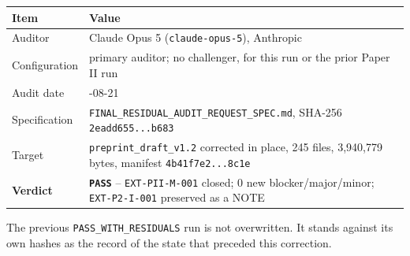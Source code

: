 \documentclass[
  10pt,
]{article}
\newcounter{none} %
\begin{document}
{\def\LTcaptype{none} %
\begin{longtable}[]{@{}
  >{\raggedright\arraybackslash}p{}
  >{\raggedright\arraybackslash}p{}@{}}
\toprule\noalign{}
\begin{minipage}[b]{\linewidth}\raggedright
Item
\end{minipage} & \begin{minipage}[b]{\linewidth}\raggedright
Value
\end{minipage} \\
\midrule\noalign{}
\endhead
\bottomrule\noalign{}
\endlastfoot
Auditor & Claude Opus 5 (\texttt{claude-opus-5}), Anthropic \\
Configuration & primary auditor; no challenger, for this run or the
prior Paper II run \\
Audit date & 2026-08-21 \\
Specification & \texttt{FINAL\_RESIDUAL\_AUDIT\_REQUEST\_SPEC.md},
SHA-256 \texttt{2eadd655...b683} \\
Target & \texttt{preprint\_draft\_v1.2} corrected in place, 245 files,
3,940,779 bytes, manifest \texttt{4b41f7e2...8c1e} \\
\textbf{Verdict} & \textbf{\texttt{PASS}} -- \texttt{EXT-PII-M-001}
closed; 0 new blocker/major/minor; \texttt{EXT-P2-I-001} preserved as a
NOTE \\
\end{longtable}
}

The previous \texttt{PASS\_WITH\_RESIDUALS} run is not overwritten. It
stands against its own hashes as the record of the state that preceded
this correction.
\end{document}
